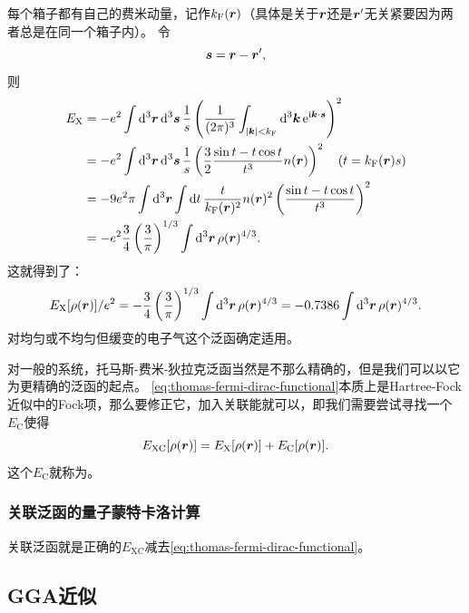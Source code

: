 每个箱子都有自己的费米动量，记作$k_\text{F}(\vb*{r})$（具体是关于$\vb*{r}$还是$\vb*{r}'$无关紧要因为两者总是在同一个箱子内）。
令
\[
    \vb*{s} = \vb*{r} - \vb*{r}', 
\]
则
\[
    \begin{aligned}
        E_\text{X} &= - e^2 \int \dd[3]{\vb*{r}} \dd[3]{\vb*{s}} \frac{1}{s} \left( \frac{1}{(2\pi)^3} \int_{\abs{\vb*{k}} < k_\text{F}} \dd[3]{\vb*{k}} \mathrm{e}^{\mathrm{i} \vb*{k} \cdot \vb*{s}} \right)^2 \\
        &= - e^2 \int \dd[3]{\vb*{r}} \dd[3]{\vb*{s}} \frac{1}{s} \left( \frac{3}{2} \frac{\sin t - t \cos t}{t^3} n(\vb*{r}) \right)^2 \quad (t= k_\text{F}(\vb*{r}) s) \\
        &= - 9 e^2 \pi \int \dd[3]{\vb*{r}} \int \dd{t} \frac{t}{k_\text{F}(\vb*{r})^2} n(\vb*{r})^2 \left( \frac{\sin t - t \cos t}{t^3} \right)^2 \\
        &= - e^2 \frac{3}{4} \left( \frac{3}{\pi} \right)^{1/3} \int \dd[3]{\vb*{r}} \rho(\vb*{r})^{4/3}.
    \end{aligned}
\]
这就得到了：
\begin{equation}
    E_\text{X}[\rho(\vb*{r})] / e^2 = - \frac{3}{4} \left( \frac{3}{\pi} \right)^{1/3} \int \dd[3]{\vb*{r}} \rho(\vb*{r})^{4/3} = - 0.7386 \int \dd[3]{\vb*{r}} \rho(\vb*{r})^{4/3}.
    \label{eq:thomas-fermi-dirac-functional}
\end{equation}
对均匀或不均匀但缓变的电子气这个泛函确定适用。

对一般的系统，托马斯-费米-狄拉克泛函当然是不那么精确的，但是我们可以以它为更精确的泛函的起点。
\eqref{eq:thomas-fermi-dirac-functional}本质上是Hartree-Fock近似中的Fock项，那么要修正它，加入关联能就可以，即我们需要尝试寻找一个$E_\text{C}$使得
\begin{equation}
    E_\text{XC}[\rho(\vb*{r})] = E_\text{X}[\rho(\vb*{r})] + E_\text{C}[\rho(\vb*{r})].
\end{equation}
这个$E_\text{C}$就称为。

\subsubsection{关联泛函的量子蒙特卡洛计算}

关联泛函就是正确的$E_\text{XC}$减去\eqref{eq:thomas-fermi-dirac-functional}。

\subsection{GGA近似}

